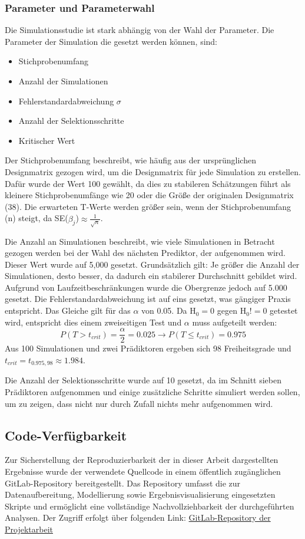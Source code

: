 \subsubsection{Parameter und Parameterwahl}
Die Simulationsstudie ist stark abhängig von der Wahl der Parameter. Die Parameter der Simulation die gesetzt werden können, sind:
\begin{itemize}
    \item Stichprobenumfang
    \item Anzahl der Simulationen
    \item Fehlerstandardabweichung $\sigma$
    \item Anzahl der Selektionsschritte
    \item Kritischer Wert
\end{itemize}


Der Stichprobenumfang beschreibt, wie häufig aus der ursprünglichen Designmatrix gezogen wird, um die Designmatrix für jede
Simulation zu erstellen. Dafür wurde der Wert 100 gewählt, da dies zu stabileren Schätzungen führt als kleinere Stichprobenumfänge
wie 20 oder die Größe der originalen Designmatrix (38). Die erwarteten T-Werte werden größer sein, wenn der Stichprobenumfang (n)
steigt, da SE($\hat{\beta_{j}}$)$\approx \frac{1}{\sqrt{n}}$. 

Die Anzahl an Simulationen beschreibt, wie viele Simulationen in Betracht gezogen werden bei der Wahl
des nächsten Prediktor, der aufgenommen wird. Dieser Wert wurde auf 5,000 gesetzt. Grundsätzlich gilt: Je größer die Anzahl der
Simulationen, desto besser, da dadurch ein stabilerer Durchschnitt gebildet wird. Aufgrund von Laufzeitbeschränkungen wurde die
Obergrenze jedoch auf 5.000 gesetzt.
Die Fehlerstandardabweichung  ist auf eins gesetzt, was gängiger Praxis entspricht. Das Gleiche gilt für das $\alpha$ von 0.05.
Da $\mathrm{H_0} = 0$ gegen $\mathrm{H_0}!= 0$ getestet wird, entspricht dies einem zweiseitigen Test und $\alpha$ muss aufgeteilt werden: 
\begin{equation}
P(T>t_{crit}) = \frac{\alpha}{2} = 0.025 \rightarrow P(T \leq t_{crit}) = 0.975
\end{equation}
Aus 100 Simulationen und zwei Prädiktoren ergeben sich 98 Freiheitsgrade und $t_{crit} = t_{0.975,98} \approx 1.984$.

Die Anzahl der Selektionsschritte wurde auf 10 gesetzt, da im Schnitt sieben Prädiktoren aufgenommen und einige zusätzliche
Schritte simuliert werden sollen, um zu zeigen, dass nicht nur durch Zufall nichts mehr aufgenommen wird.

\subsection{Code-Verfügbarkeit}
Zur Sicherstellung der Reproduzierbarkeit der in dieser Arbeit dargestellten Ergebnisse wurde der verwendete Quellcode in einem öffentlich zugänglichen GitLab-Repository bereitgestellt. 
Das Repository umfasst die zur Datenaufbereitung, Modellierung sowie Ergebnisvisualisierung eingesetzten Skripte und ermöglicht eine vollständige Nachvollziehbarkeit der durchgeführten Analysen.
Der Zugriff erfolgt über folgenden Link:
\href{https://git.uni-jena.de/anshul.khubchandani.espinoza/statistik/-/tree/clean-version?ref_type=heads}{GitLab-Repository der Projektarbeit}
